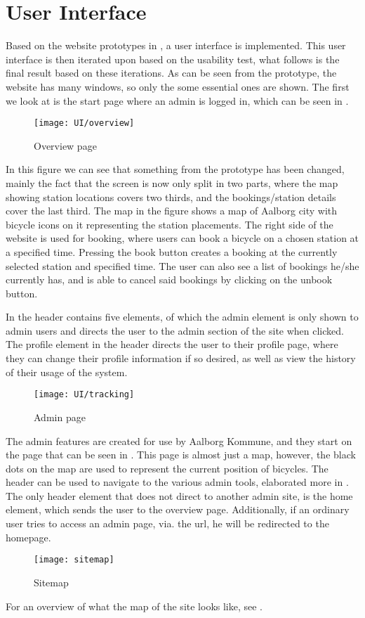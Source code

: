 \section{User Interface}
Based on the website prototypes in , a user interface is implemented. 
This user interface is then iterated upon based on the usability test, what follows is the final result based on these iterations. 
As can be seen from the prototype, the website has many windows, so only the some essential ones are shown.
The first we look at is the start page where an admin is logged in, which can be seen in .

\begin{figure}[h]
	\centering
	\texttt{[image: UI/overview]}
	\caption{Overview page}\label{fig:UI-overview}
\end{figure}

In this figure we can see that something from the prototype has been changed, mainly the fact that the screen is now only split in two parts, where the map showing station locations covers two thirds, and the bookings/station details cover the last third.
The map in the figure shows a map of Aalborg city with bicycle icons on it representing the station placements.
The right side of the website is used for booking, where users can book a bicycle on a chosen station at a specified time.
Pressing the book button creates a booking at the currently selected station and specified time.
The user can also see a list of bookings he/she currently has, and is able to cancel said bookings by clicking on the unbook button.

In  the header contains five elements, of which the admin element is only shown to admin users and directs the user to the admin section of the site when clicked.
The profile element in the header directs the user to their profile page, where they can change their profile information if so desired, as well as view the history of their usage of the system.

\begin{figure}[h]
	\centering
	\texttt{[image: UI/tracking]}
	\caption{Admin page}\label{fig:UI-admin}
\end{figure}

The admin features are created for use by Aalborg Kommune, and they start on the page that can be seen in .
This page is almost just a map, however, the black dots on the map are used to represent the current position of bicycles.
The header can be used to navigate to the various admin tools, elaborated more in .
The only header element that does not direct to another admin site, is the home element, which sends the user to the overview page.
Additionally, if an ordinary user tries to access an admin page, via. the url, he will be redirected to the homepage.

\begin{figure}[h]
	\centering
	\texttt{[image: sitemap]}
	\caption{Sitemap}\label{fig:sitemap}
\end{figure}

For an overview of what the map of the site looks like, see .
